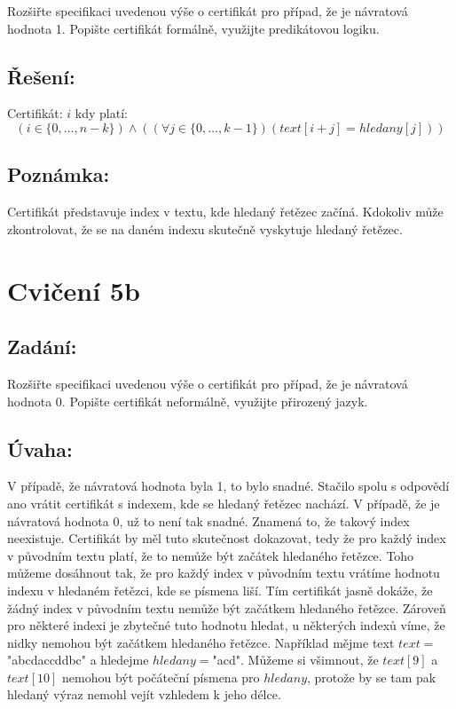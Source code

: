 \documentclass{article}
\begin{document}
Rozšiřte specifikaci uvedenou výše o certifikát pro případ, že je návratová hodnota 1. Popište certifikát formálně, využijte predikátovou logiku.

\subsection{Řešení:}

Certifikát: $i$ kdy platí: 
$$(i \in \{0,\dots,n-k\}) \wedge  ((\forall j \in \{0,\dots,k-1\})(text[i+j] = hledany[j]))$$

\subsection{Poznámka:}
Certifikát představuje index v textu, kde hledaný řetězec začíná. Kdokoliv může zkontrolovat, že se na daném indexu skutečně vyskytuje hledaný řetězec.

\section{Cvičení 5b}

\subsection{Zadání:}

Rozšiřte specifikaci uvedenou výše o certifikát pro případ, že je návratová hodnota 0. Popište certifikát neformálně, využijte přirozený jazyk.

\subsection{Úvaha:}
V případě, že návratová hodnota byla 1, to bylo snadné. Stačilo spolu s odpovědí ano vrátit certifikát s indexem, kde se hledaný řetězec nachází. V případě, že je návratová hodnota 0, už to není tak snadné. Znamená to, že takový index neexistuje. Certifikát by měl tuto skutečnost dokazovat, tedy že pro každý index v původním textu platí, že to nemůže být začátek hledaného řetězce. Toho můžeme dosáhnout tak, že pro každý index v původním textu vrátíme hodnotu indexu v hledaném řetězci, kde se písmena liší. Tím certifikát jasně dokáže, že žádný index v původním textu nemůže být začátkem hledaného řetězce. Zároveň pro některé indexi je zbytečné tuto hodnotu hledat, u některých indexů víme, že nidky nemohou být začátkem hledaného řetězce. Například mějme text $text=$"abcdaccddbc" a hledejme $hledany=$"acd". Můžeme si všimnout, že $text[9]$ a $text[10]$ nemohou být počáteční písmena pro $hledany$, protože by se tam pak hledaný výraz nemohl vejít vzhledem k jeho délce.
\end{document}
